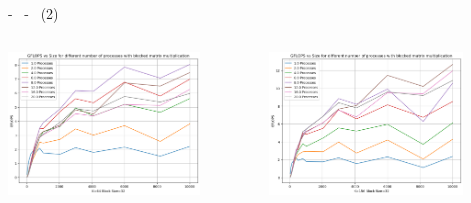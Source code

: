\documentclass[compress]{beamer}
\begin{document}
\begin{frame}{\secname \text{ }- \subsecname\ \text{ }- \subsubsecname\ (2)}
\begin{columns}
\begin{minipage}{1\textwidth}
                \centering
                \begin{adjustbox}{margin=0cm 0cm 0cm 0cm, center} %
                    \includegraphics[width=0.8\textwidth, frame]{resources/rettangolari_k64_blocked.png}
                \end{adjustbox}
                \begin{adjustbox}{margin=0cm 0cm 0cm 0.1cm, center} %
                    \includegraphics[width=0.8\textwidth, frame]{resources/rettangolari_k156_blocked.png}
                \end{adjustbox}
            \end{minipage}
    \end{columns}
\end{frame}
\end{document}
